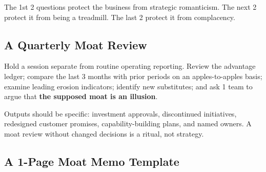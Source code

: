 The 1st 2 questions protect the business from strategic romanticism. The next 2 protect it from being a treadmill. The last 2 protect it from complacency.

\subsection{A Quarterly Moat Review}
\label{sec:quarterly_moat_review}

Hold a session separate from routine operating reporting. Review the advantage ledger; compare the last 3 months with prior periods on an apples-to-apples basis; examine leading erosion indicators; identify new substitutes; and ask 1 team to argue that \textbf{the supposed moat is an illusion}.

Outputs should be specific: investment approvals, discontinued initiatives, redesigned customer promises, capability-building plans, and named owners. A moat review without changed decisions is a ritual, not strategy.

\subsection{A 1-Page Moat Memo Template}
\label{sec:one_page_moat_memo_template}

